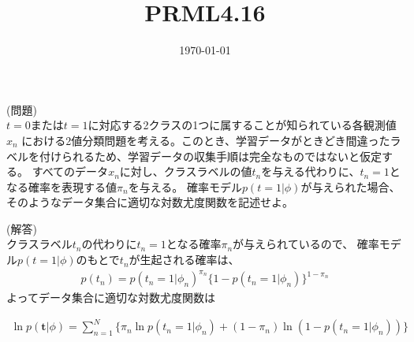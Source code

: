 \documentclass{jsarticle}
\title{PRML4.16}
\date{\today}
\begin{document}
\maketitle

(問題)\\
$t= 0$または$t = 1$に対応する2クラスの1つに属することが知られている各観測値$x_n$
における2値分類問題を考える。このとき、学習データがときどき間違ったラベルを付けられるため、学習データの収集手順は完全なものではないと仮定する。
すべてのデータ$x_n$に対し、クラスラベルの値$t_n$を与える代わりに、$t_n=1$となる確率を表現する値$π_n$を与える。
確率モデル$p(t=1|\phi)$が与えられた場合、そのようなデータ集合に適切な対数尤度関数を記述せよ。

(解答) \\
クラスラベル$t_n$の代わりに$t_n=1$となる確率$\pi_n$が与えられているので、
確率モデル$p(t=1|\phi)$のもとで$t_n$が生起される確率は、
\begin{align*}
    p(t_n) = p(t_n=1|\phi_n)^{\pi_n} \{ 1 - p(t_n=1|\phi_n) \}^{1-\pi_n}
\end{align*}
よってデータ集合に適切な対数尤度関数は

\begin {align*}
\ln p\left(\mathbf{t} | \phi\right)=\sum_{n=1}^N \{\pi_{n} \ln p(t_n=1|\phi_n)+(1-\pi_{n} ) \ln \left(1-p(t_n=1|\phi_n)\right)\}
\end {align*}
\end{document}

